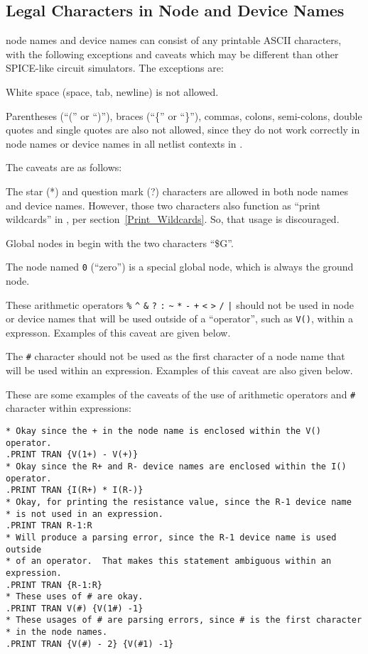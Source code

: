 \subsection{Legal Characters in Node and Device Names}
\label{legalCharacters}
 
\Xyce{} node names and device names can consist of any printable ASCII
characters, with the following exceptions and caveats which may be
different than other SPICE-like circuit simulators.  The exceptions are:
\begin{XyceItemize}
\item White space (space, tab, newline) is not allowed.
\item Parentheses (``('' or ``)''), braces (``\{'' or ``\}''), commas,
colons, semi-colons, double quotes and single quotes are also not
allowed, since they do not work correctly in node names or device names
in all netlist contexts in \Xyce{}.
\end{XyceItemize}
The caveats are as follows:
\begin{XyceItemize}
\item The star (*) and question mark (?) characters are allowed in both
node names and device names.  However, those two characters also function
as ``print wildcards'' in \Xyce{}, per section~\ref{Print_Wildcards}.
So, that usage is discouraged.
\item Global nodes in \Xyce{} begin with the two characters ``\$G''.
\item The node named \texttt{0} (``zero'') is a special global node,
which is always the ground node.
\item These arithmetic operators \verb|%| \verb|^| \verb|&| \verb|?| \verb|:|
\verb|~| \verb|*| \verb|-| \verb|+| \verb|<| \verb|>| \verb|/|
\verb+|+ should not be used in node or device names that will
be used outside of a \Xyce{} ``operator'', such as \texttt{V()}, within
a \Xyce{} expresson.  Examples of this caveat are given below.
\item The \verb|#| character should not be used as the first character
of a node name that will be used within an expression.  Examples of this
caveat are also given below.
\end{XyceItemize}
These are some examples of the caveats of the use of arithmetic operators
and \verb|#| character within expressions:
\begin{verbatim}
* Okay since the + in the node name is enclosed within the V() operator.
.PRINT TRAN {V(1+) - V(+)}
* Okay since the R+ and R- device names are enclosed within the I() operator.
.PRINT TRAN {I(R+) * I(R-)}
* Okay, for printing the resistance value, since the R-1 device name
* is not used in an expression.
.PRINT TRAN R-1:R
* Will produce a parsing error, since the R-1 device name is used outside
* of an operator.  That makes this statement ambiguous within an expression.
.PRINT TRAN {R-1:R}
* These uses of # are okay.
.PRINT TRAN V(#) {V(1#) -1}
* These usages of # are parsing errors, since # is the first character
* in the node names.
.PRINT TRAN {V(#) - 2} {V(#1) -1}
\end{verbatim}

